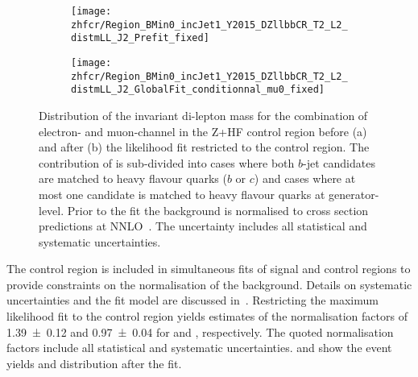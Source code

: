 
\begin{figure}[htbp]
  \centering


  \begin{subfigure}{.485\textwidth}
    \texttt{[image: zhfcr/Region\_BMin0\_incJet1\_Y2015\_DZllbbCR\_T2\_L2\_distmLL\_J2\_Prefit\_fixed]}
    \label{fig:zcr_mll_prefit}
  \end{subfigure}\hfill%
  \begin{subfigure}{.485\textwidth}
    \texttt{[image: zhfcr/Region\_BMin0\_incJet1\_Y2015\_DZllbbCR\_T2\_L2\_distmLL\_J2\_GlobalFit\_conditionnal\_mu0\_fixed]}
    \label{fig:zcr_mll_postfit}
  \end{subfigure}

  \caption{Distribution of the invariant di-lepton mass for the
    combination of electron- and muon-channel in the Z+HF control
    region before (a) and after (b) the likelihood fit restricted to
    the control region. The contribution of \Zjets is sub-divided into
    cases where both $b$-jet candidates are matched to heavy flavour
    quarks ($b$ or $c$) and cases where at most one candidate is
    matched to heavy flavour quarks at generator-level. Prior to the
    fit the \Zjets background is normalised to cross section
    predictions at NNLO~\cite{Anastasiou:2003ds}. The uncertainty
    includes all statistical and systematic uncertainties.}
\end{figure}

The \ZHF control region is included in simultaneous fits of signal and
control regions to provide constraints on the normalisation of the
\ZHF background. Details on systematic uncertainties and the fit model
are discussed
in~. Restricting the
maximum likelihood fit to the control region yields estimates of the
normalisation factors of \num{1.39 \pm 0.12} and \num{0.97 \pm 0.04}
for \ZHF and \ttbar, respectively. The quoted normalisation factors
include all statistical and systematic
uncertainties.  and 
show the event yields and \mll distribution after the fit.



